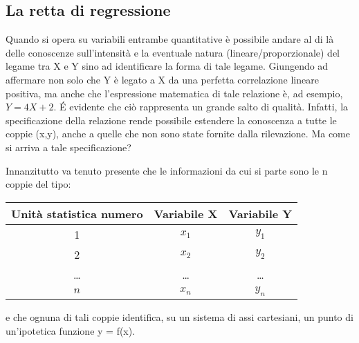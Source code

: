 \subsection{La retta di regressione}
 Quando si opera su variabili entrambe quantitative è possibile andare al 
di là delle conoscenze sull'intensità e la eventuale natura 
(lineare/proporzionale) del legame tra X e Y sino ad identificare la forma 
di tale legame. Giungendo ad affermare non solo che Y è legato a X da una 
perfetta correlazione lineare positiva, ma anche che l'espressione 
matematica di tale relazione è, ad esempio, $Y=4 X +2$.
 \'E evidente che ciò rappresenta un grande salto di qualità. Infatti, la 
specificazione della relazione rende possibile estendere la conoscenza a 
tutte le coppie (x,y), anche a quelle che non sono state fornite dalla 
rilevazione.
 Ma come si arriva a tale specificazione?
 
 Innanzitutto va tenuto presente che le informazioni da cui si parte sono 
le n coppie del tipo:

 \begin{tabular}{|c|c|c|}
        \hline
        Unità statistica numero &       Variabile X&    Variabile Y\\\hline
        1&      $x_1$&  $y_1$\\\hline
        2&      $x_2$&  $y_2$\\\hline
        \dots&  \dots&\dots\\\hline
        $n$&    $x_n$&  $y_n$\\\hline
 \end{tabular}
 
\vspace{6pt}
 e che ognuna di tali coppie identifica, su un sistema di assi cartesiani, 
un punto di un'ipotetica funzione y = f(x).
 
